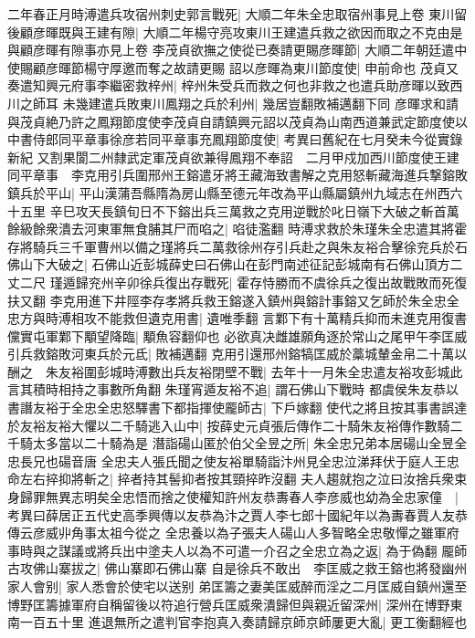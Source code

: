 二年春正月時溥遣兵攻宿州刺史郭言戰死|{
	大順二年朱全忠取宿州事見上卷}
東川留後顧彦暉既與王建有隙|{
	大順二年楊守亮攻東川王建遣兵救之欲因而取之不克由是與顧彦暉有隙事亦見上卷}
李茂貞欲撫之使從已奏請更賜彦暉節|{
	大順二年朝廷遣中使賜顧彦暉節楊守厚邀而奪之故請更賜}
詔以彦暉為東川節度使|{
	申前命也}
茂貞又奏遣知興元府事李繼密救梓州|{
	梓州朱受兵而救之何也非救之也遣兵助彦暉以致西川之師耳}
未幾建遣兵敗東川鳳翔之兵於利州|{
	幾居豈翻敗補邁翻下同}
彦暉求和請與茂貞絶乃許之鳳翔節度使李茂貞自請鎮興元詔以茂貞為山南西道兼武定節度使以中書侍郎同平章事徐彦若同平章事充鳳翔節度使|{
	考異曰舊紀在七月癸未今從實錄新紀}
又割果閬二州隸武定軍茂貞欲兼得鳳翔不奉詔　二月甲戍加西川節度使王建同平章事　李克用引兵圍邢州王鎔遣牙將王藏海致書解之克用怒斬藏海進兵撃鎔敗鎮兵於平山|{
	平山漢蒲吾縣隋為房山縣至德元年改為平山縣屬鎮州九域志在州西六十五里}
辛巳攻天長鎮旬日不下鎔出兵三萬救之克用逆戰於叱日嶺下大破之斬首萬餘級餘衆潰去河東軍無食脯其尸而啗之|{
	啗徒濫翻}
時溥求救於朱瑾朱全忠遣其將霍存將騎兵三千軍曹州以備之瑾將兵二萬救徐州存引兵赴之與朱友裕合擊徐兖兵於石佛山下大破之|{
	石佛山近彭城薛史曰石佛山在彭門南述征記彭城南有石佛山頂方二丈二尺}
瑾遁歸兖州辛卯徐兵復出存戰死|{
	霍存恃勝而不虞徐兵之復出故戰敗而死復扶又翻}
李克用進下井陘李存孝將兵救王鎔遂入鎮州與鎔計事鎔又乞師於朱全忠全忠方與時溥相攻不能救但遺克用書|{
	遺唯季翻}
言鄴下有十萬精兵抑而未進克用復書儻實屯軍鄴下顒望降臨|{
	顒魚容翻仰也}
必欲真决雌雄願角逐於常山之尾甲午李匡威引兵救鎔敗河東兵於元氐|{
	敗補邁翻}
克用引還邢州鎔犒匡威於藁城輦金帛二十萬以酬之　朱友裕圍彭城時溥數出兵友裕閉壁不戰|{
	去年十一月朱全忠遣友裕攻彭城此言其積時相持之事數所角翻}
朱瑾宵遁友裕不追|{
	謂石佛山下戰時}
都虞侯朱友恭以書譖友裕于全忠全忠怒驛書下都指揮使龎師古|{
	下戶嫁翻}
使代之將且按其事書誤達於友裕友裕大懼以二千騎逃入山中|{
	按薛史元貞張后傳作二十騎朱友裕傳作數騎二千騎太多當以二十騎為是}
潛詣碭山匿於伯父全昱之所|{
	朱全忠兄弟本居碭山全昱全忠長兄也碭音唐}
全忠夫人張氏聞之使友裕單騎詣汴州見全忠泣涕拜伏于庭人王忠命左右捽抑將斬之|{
	捽者持其髻抑者按其頸捽昨沒翻}
夫人趨就抱之泣曰汝捨兵衆束身歸罪無異志明矣全忠悟而捨之使權知許州友恭夀春人李彦威也幼為全忠家僮　|{
	考異曰薛居正五代史高季興傳以友恭為汴之賈人李七郎十國紀年以為夀春賈人友恭傳云彦威丱角事太祖今從之}
全忠養以為子張夫人碭山人多智略全忠敬憚之雖軍府事時與之謀議或將兵出中塗夫人以為不可遣一介召之全忠立為之返|{
	為于偽翻}
龎師古攻佛山寨拔之|{
	佛山寨即石佛山寨}
自是徐兵不敢出　李匡威之救王鎔也將發幽州家人會别|{
	家人悉會於使宅以送别}
弟匡籌之妻美匡威醉而淫之二月匡威自鎮州還至博野匡籌據軍府自稱留後以符追行營兵匡威衆潰歸但與親近留深州|{
	深州在博野東南一百五十里}
進退無所之遣判官李抱真入奏請歸京師京師屢更大亂|{
	更工衡翻經也}
